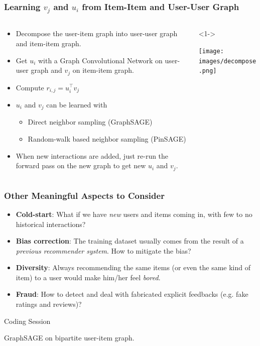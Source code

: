 \documentclass[11pt]{beamer}
\begin{document}
	\begin{frame}
		\frametitle{Learning $v_j$ and $u_i$ from Item-Item and User-User Graph}
		\begin{columns}
			\begin{column}{0.6\textwidth}
				\begin{itemize}
					\item<1-> Decompose the user-item graph into user-user graph and item-item graph.
					\item<2-> Get $u_i$ with a Graph Convolutional Network on user-user graph and $v_j$ on item-item graph.
					\item<3-> Compute $r_{i,j} = u_i^\top v_j$
					\item<4-> $u_i$ and $v_j$ can be learned with
					\begin{itemize}
						\item Direct neighbor sampling (GraphSAGE)
						\item Random-walk based neighbor sampling (PinSAGE)
					\end{itemize}
					\item<5-> When new interactions are added, just re-run the forward pass on the new graph to get new $u_i$ and $v_j$.
				\end{itemize}
			\end{column}
			\begin{column}{0.4\textwidth}<1->
				\begin{center}
					\centering
					\texttt{[image: images/decompose.png]}
				\end{center}
			\end{column}
		\end{columns}
	\end{frame}

	\begin{frame}
		\frametitle{Other Meaningful Aspects to Consider}
		\begin{itemize}
			\item \textbf{Cold-start}: What if we have \textit{new} users and items coming in, with few to no historical interactions? \pause
			\item \textbf{Bias correction}: The training dataset usually comes from the result of a \textit{previous recommender system}.  How to mitigate the bias? \pause
			\item \textbf{Diversity}: Always recommending the same items (or even the same kind of item) to a user would make him/her feel \textit{bored}. \pause
			\item \textbf{Fraud}: How to detect and deal with fabricated explicit feedbacks (e.g. fake ratings and reviews)?
		\end{itemize}
	\end{frame}

	\begin{frame}
		\begin{center}
			\centering
			\Huge Coding Session
			
			\Large GraphSAGE on bipartite user-item graph.
		\end{center}
	\end{frame}
\end{document}
